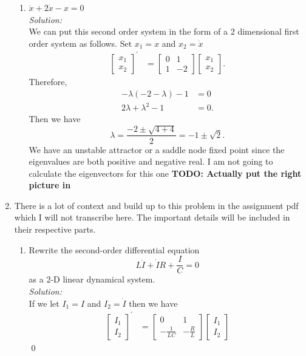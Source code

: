 \documentclass[10pt]{amsart}
\theoremstyle{nonumberplain}
\begin{document}
\begin{enumerate}[label={\bf {\arabic*}:}]
\begin{enumerate}
\item $\ddot x + 2\dot x - x = 0$ \\
\textit{Solution:} \\
We can put this second order system in the form of a 2 dimensional first order system as follows.
Set $x_1 = x$ and $x_2 = \dot x$
\begin{align*}
\begin{bmatrix}
x_1 \\ x_2
\end{bmatrix}^\prime
&= \begin{bmatrix}
0 & 1 \\
1 & -2
\end{bmatrix} \begin{bmatrix}
x_1 \\ x_2
\end{bmatrix}.
\end{align*}
Therefore,
\begin{align*}
-\lambda(-2 -\lambda) - 1 &= 0 \\
2\lambda + \lambda^2 - 1 &= 0.
\end{align*}
Then we have
$$
\lambda = \frac{-2 \pm \sqrt{4 +4}} 2 = -1 \pm \sqrt 2.
$$
We have an unstable attractor or a saddle node fixed point since the eigenvalues are both positive and negative real.
I am not going to calculate the eigenvectors for this one \textbf{TODO: Actually put the right picture in}

\end{enumerate}

\newpage

\item There is a lot of context and build up to this problem in the assignment pdf which I will not transcribe here.
The important details will be included in their respective parts. \\

\begin{enumerate}

\item Rewrite the second-order differential equation
$$L \ddot I + \dot I R + \frac I C = 0$$
as a 2-D linear dynamical system. \\
\textit{Solution:} \\
If we let $I_1 = I$ and $I_2 = \dot I$ then we have
\begin{align*}
\begin{bmatrix}
I_1 \\ I_2
\end{bmatrix}^\prime
&= \begin{bmatrix}
0 & 1 \\
-\frac 1 {LC} & -\frac R L
\end{bmatrix} \begin{bmatrix}
I_1 \\ I_2
\end{bmatrix}
\end{align*}
\qed \\


\end{enumerate}
\end{enumerate}
\end{document}
